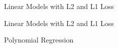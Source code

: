 \documentclass[11pt,compress,t,notes=noshow, xcolor=table]{beamer}
\begin{document}
\begin{vbframe}{Linear Models with L2 and L1 Loss}





\end{vbframe}

\begin{vbframe}{Linear Models with L2 and L1 Loss}

\end{vbframe}



\begin{vbframe}{Polynomial Regression}




\end{vbframe}



\endlecture
\end{document}
